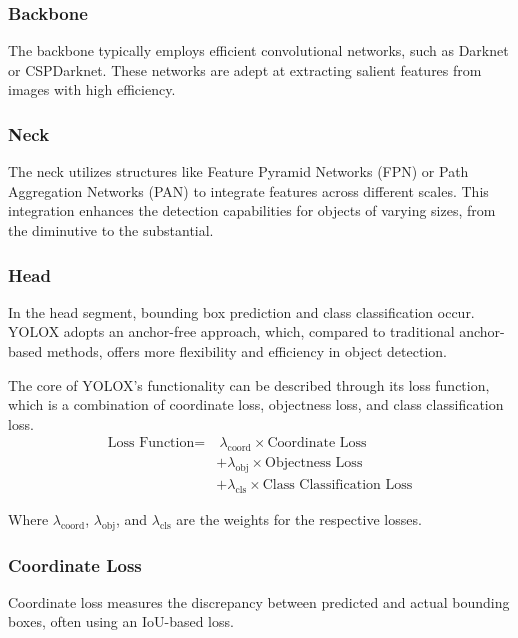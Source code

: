 \subsubsection{Backbone}
\label{sec:Backbone}
\singlespacing
The backbone typically employs efficient convolutional networks, such as Darknet or CSPDarknet. These networks are adept at extracting salient features from images with high efficiency.

\subsubsection{Neck}
\label{sec:Neck}
\singlespacing
The neck utilizes structures like Feature Pyramid Networks (FPN) or Path Aggregation Networks (PAN) to integrate features across different scales. This integration enhances the detection capabilities for objects of varying sizes, from the diminutive to the substantial.

\subsubsection{Head}
\label{sec:Head}
\singlespacing
In the head segment, bounding box prediction and class classification occur. YOLOX adopts an anchor-free approach, which, compared to traditional anchor-based methods, offers more flexibility and efficiency in object detection.



The core of YOLOX's functionality can be described through its loss function, which is a combination of coordinate loss, objectness loss, and class classification loss.
\singlespacing
\begin{align}
\text{Loss Function} = & \ \lambda_{\text{coord}} \times \text{Coordinate Loss} \nonumber \\
                      & + \lambda_{\text{obj}} \times \text{Objectness Loss} \nonumber \\
                      & + \lambda_{\text{cls}} \times \text{Class Classification Loss}
\label{equ:Loss Function}
\end{align}

Where $\lambda_{\text{coord}}$, $\lambda_{\text{obj}}$, and $\lambda_{\text{cls}}$ are the weights for the respective losses.

\subsubsection{Coordinate Loss}
\singlespacing
Coordinate loss measures the discrepancy between predicted and actual bounding boxes, often using an IoU-based loss.

